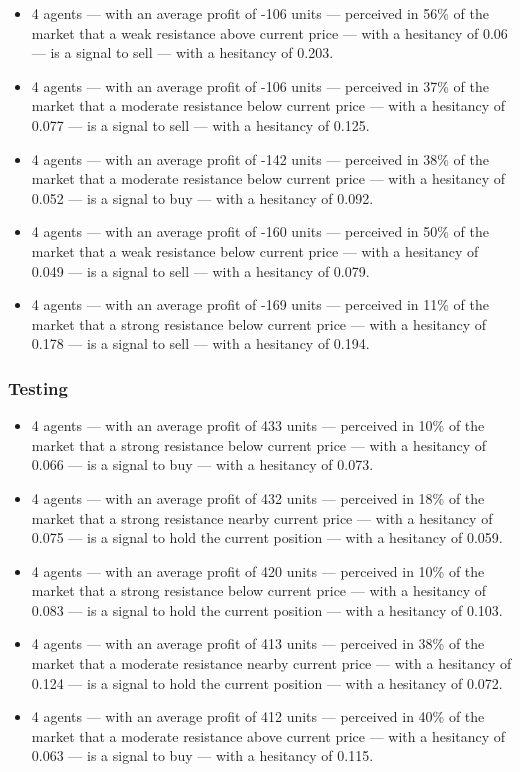 {\scriptsize
  \begin{itemize}
    \item 4 agents — with an average profit of -106 units — perceived in 56\% of
      the market that a weak resistance above current price — with a hesitancy
      of 0.06 — is a signal to sell — with a hesitancy of 0.203.
\item 4 agents — with an average profit of -106 units — perceived in 37\% of the
  market that a moderate resistance below current price — with a hesitancy of
  0.077 — is a signal to sell — with a hesitancy of 0.125.
\item 4 agents — with an average profit of -142 units — perceived in 38\% of the
  market that a moderate resistance below current price — with a hesitancy of
  0.052 — is a signal to buy — with a hesitancy of 0.092.
\item 4 agents — with an average profit of -160 units — perceived in 50\% of the
  market that a weak resistance below current price — with a hesitancy of 0.049
  — is a signal to sell — with a hesitancy of 0.079.
\item 4 agents — with an average profit of -169 units — perceived in 11\% of the
  market that a strong resistance below current price — with a hesitancy of
  0.178 — is a signal to sell — with a hesitancy of 0.194.
  \end{itemize}
}

\subsubsection{Testing}
\label{}

{\scriptsize
  \begin{itemize}
    \item 4 agents — with an average profit of 433 units — perceived in 10\% of
      the market that a strong resistance below current price — with a hesitancy
      of 0.066 — is a signal to buy — with a hesitancy of 0.073.
\item 4 agents — with an average profit of 432 units — perceived in 18\% of the
  market that a strong resistance nearby current price — with a hesitancy of
  0.075 — is a signal to hold the current position — with a hesitancy of 0.059.
\item 4 agents — with an average profit of 420 units — perceived in 10\% of the
  market that a strong resistance below current price — with a hesitancy of
  0.083 — is a signal to hold the current position — with a hesitancy of 0.103.
\item 4 agents — with an average profit of 413 units — perceived in 38\% of the
  market that a moderate resistance nearby current price — with a hesitancy of
  0.124 — is a signal to hold the current position — with a hesitancy of 0.072.
\item 4 agents — with an average profit of 412 units — perceived in 40\% of the
  market that a moderate resistance above current price — with a hesitancy of
  0.063 — is a signal to buy — with a hesitancy of 0.115.
  \end{itemize}
}

